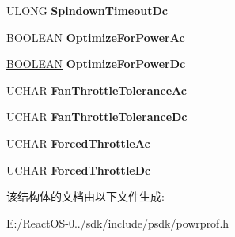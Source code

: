\begin{DoxyCompactItemize}
U\+L\+O\+NG {\bfseries Spindown\+Timeout\+Dc}
\item 
\mbox{\label{struct___u_s_e_r___p_o_w_e_r___p_o_l_i_c_y_ae6724558e7290058976631a8e9cccb91}} 
\hyperlink{_processor_bind_8h_a112e3146cb38b6ee95e64d85842e380a}{B\+O\+O\+L\+E\+AN} {\bfseries Optimize\+For\+Power\+Ac}
\item 
\mbox{\label{struct___u_s_e_r___p_o_w_e_r___p_o_l_i_c_y_a67da6437efdbca967e70e32f8642d975}} 
\hyperlink{_processor_bind_8h_a112e3146cb38b6ee95e64d85842e380a}{B\+O\+O\+L\+E\+AN} {\bfseries Optimize\+For\+Power\+Dc}
\item 
\mbox{\label{struct___u_s_e_r___p_o_w_e_r___p_o_l_i_c_y_a51ba550e21840c9697985453b98eb78e}} 
U\+C\+H\+AR {\bfseries Fan\+Throttle\+Tolerance\+Ac}
\item 
\mbox{\label{struct___u_s_e_r___p_o_w_e_r___p_o_l_i_c_y_a3dbcbf0cf7c83560327120831bc1b8f0}} 
U\+C\+H\+AR {\bfseries Fan\+Throttle\+Tolerance\+Dc}
\item 
\mbox{\label{struct___u_s_e_r___p_o_w_e_r___p_o_l_i_c_y_aa5c8ddd40f392f9042f70e4468a99d96}} 
U\+C\+H\+AR {\bfseries Forced\+Throttle\+Ac}
\item 
\mbox{\label{struct___u_s_e_r___p_o_w_e_r___p_o_l_i_c_y_aac27ad1df8262d5eb4b4e62a7f79d37b}} 
U\+C\+H\+AR {\bfseries Forced\+Throttle\+Dc}
\end{DoxyCompactItemize}


该结构体的文档由以下文件生成\+:\begin{DoxyCompactItemize}
\item 
E\+:/\+React\+O\+S-\/0../sdk/include/psdk/powrprof.\+h\end{DoxyCompactItemize}
